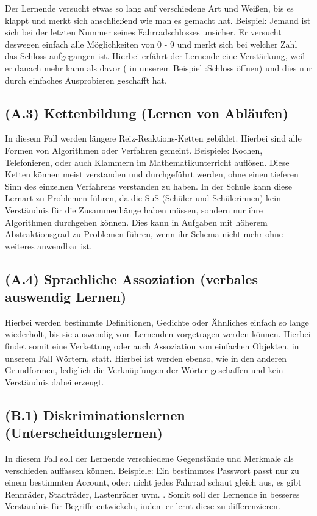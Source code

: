 Der Lernende versucht etwas so lang auf verschiedene Art und Weißen, bis es klappt und merkt sich anschließend wie man es gemacht hat. 
Beispiel: Jemand ist sich bei der letzten Nummer seines Fahrradschlosses unsicher. Er versucht deswegen einfach alle Möglichkeiten von 0 - 9 und merkt sich bei welcher Zahl das Schloss aufgegangen ist. Hierbei erfährt der Lernende eine Verstärkung, weil er danach mehr kann als davor ( in unserem Beispiel :Schloss öffnen) und dies nur durch einfaches Ausprobieren geschafft hat.

\subsection[]{(A.3) Kettenbildung (Lernen von Abläufen)}

In diesem Fall werden längere Reiz-Reaktions-Ketten gebildet. Hierbei sind alle Formen von Algorithmen oder Verfahren gemeint. Beispiele: Kochen, Telefonieren, oder auch Klammern im Mathematikunterricht auflösen. Diese Ketten können meist verstanden und durchgeführt werden, ohne einen tieferen Sinn des einzelnen Verfahrens verstanden zu haben. In der Schule kann diese Lernart zu Problemen führen, da die SuS (Schüler und Schülerinnen) kein Verständnis für die Zusammenhänge haben müssen, sondern nur ihre Algorithmen durchgehen können. Dies kann in Aufgaben mit höherem Abstraktionsgrad zu Problemen führen, wenn ihr Schema nicht mehr ohne weiteres anwendbar ist.

\subsection[]{(A.4) Sprachliche Assoziation (verbales auswendig Lernen)}

Hierbei werden bestimmte Definitionen, Gedichte oder Ähnliches einfach so lange wiederholt, bis sie auswendig vom Lernenden vorgetragen werden können. Hierbei findet somit eine Verkettung oder auch Assoziation von einfachen Objekten, in unserem Fall Wörtern, statt. Hierbei ist werden ebenso, wie in den anderen Grundformen, lediglich die Verknüpfungen der Wörter geschaffen und kein Verständnis dabei erzeugt. 

\subsection[]{(B.1) Diskriminationslernen (Unterscheidungslernen)}

In diesem Fall soll der Lernende verschiedene Gegenstände und Merkmale als verschieden auffassen können. Beispiele: Ein bestimmtes Passwort passt nur zu einem bestimmten Account, oder: nicht jedes Fahrrad schaut gleich aus, es gibt Rennräder, Stadträder, Lastenräder uvm.  . Somit soll der Lernende in besseres Verständnis für Begriffe entwickeln, indem er lernt diese zu differenzieren.

